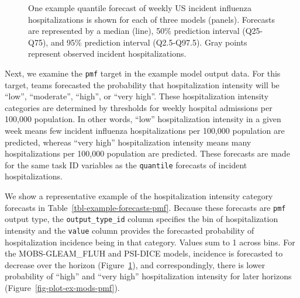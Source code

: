 \documentclass[
  article,
  shortnames,
  notitle]{jss}
\begin{document}
\begin{figure}[H]


\caption{\label{fig-plot-ex-mods}One example quantile forecast of weekly
US incident influenza hospitalizations is shown for each of three models
(panels). Forecasts are represented by a median (line), 50\% prediction
interval (Q25-Q75), and 95\% prediction interval (Q2.5-Q97.5). Gray
points represent observed incident hospitalizations.}

\end{figure}%

Next, we examine the \texttt{pmf} target in the example model output
data. For this target, teams forecasted the probability that
hospitalization intensity will be ``low'', ``moderate'', ``high'', or
``very high''. These hospitalization intensity categories are determined
by thresholds for weekly hospital admissions per 100,000 population. In
other words, ``low'' hospitalization intensity in a given week means few
incident influenza hospitalizations per 100,000 population are
predicted, whereas ``very high'' hospitalization intensity means many
hospitalizations per 100,000 population are predicted. These forecasts
are made for the same task ID variables as the \texttt{quantile}
forecasts of incident hospitalizations.

We show a representative example of the hospitalization intensity
category forecasts in Table~\ref{tbl-example-forecasts-pmf}. Because
these forecasts are \texttt{pmf} output type, the
\texttt{output\_type\_id} column specifies the bin of hospitalization
intensity and the \texttt{value} column provides the forecasted
probability of hospitalization incidence being in that category. Values
sum to 1 across bins. For the MOBS-GLEAM\_FLUH and PSI-DICE models,
incidence is forecasted to decrease over the horizon
(Figure~\ref{fig-plot-ex-mods}), and correspondingly, there is lower
probability of ``high'' and ``very high'' hospitalization intensity for
later horizons (Figure~\ref{fig-plot-ex-mods-pmf}).
\end{document}
